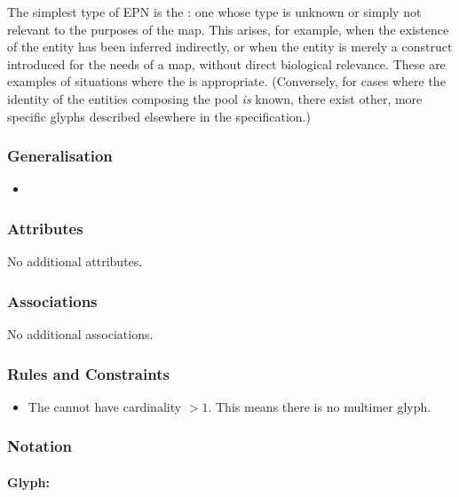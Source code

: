 The simplest type of EPN is the : one whose
type is unknown or simply not relevant to the purposes of the map.
This arises, for example, when the existence of the entity has been
inferred indirectly, or when the entity is merely a construct
introduced for the needs of a map, without direct biological
relevance.  These are examples of situations where the
 is appropriate.  (Conversely, for
cases where the identity of the entities composing the pool \emph{is}
known, there exist other, more specific glyphs described elsewhere in
the specification.)

\subsubsection{Generalisation}

\begin{itemize}
\item {}
\end{itemize}

\subsubsection{Attributes}

No additional attributes.

\subsubsection{Associations}

No additional associations.

\subsubsection{Rules and Constraints}

\begin{itemize}
\item The  cannot have cardinality $>
  1$. This means there is no multimer glyph.
\end{itemize}

\subsubsection{Notation}

\paragraph{Glyph: }


